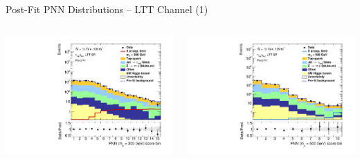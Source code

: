 \documentclass[11pt, xcolor={dvipsnames}, aspectratio=169, notes]{beamer}
\begin{document}

\begin{frame}{Post-Fit PNN Distributions -- \allbold{\lephad} LTT Channel (1)}
  \begin{columns}
    \centering


    \includegraphics[width=\textwidth]{results_res/postfit/Region_BMin0_incJet1_dist300_J2_D2HDMPNN_T2_SpcTauLH_Y2015_LTT1_L1_GlobalFit_conditionnal_mu0log}

    \centering


    \includegraphics[width=\textwidth]{results_res/postfit/Region_BMin0_incJet1_dist500_J2_D2HDMPNN_T2_SpcTauLH_Y2015_LTT1_L1_GlobalFit_conditionnal_mu0log}


\end{columns}
\end{frame}
\end{document}
